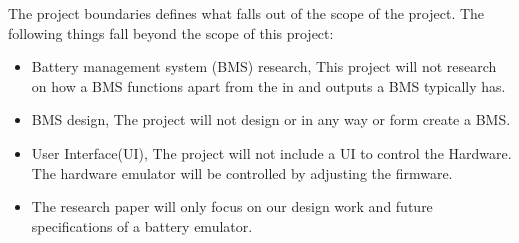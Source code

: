 \IEEEPARstart
{T}{he} project boundaries defines what falls out of the scope of the project. The following
things fall beyond the scope of this project:
\begin{itemize}
    \item Battery management system (BMS) research, This project will not research on how a BMS
    functions apart from the in and outputs a BMS typically has.
    \item BMS design, The project will not design or in any way or form create a BMS.
    \item User Interface(UI), The project will not include a UI to control the Hardware. 
    The hardware emulator will be controlled by adjusting the firmware.
    \item The research paper will only focus on our design work and future 
    specifications of a battery emulator.
\end{itemize}
